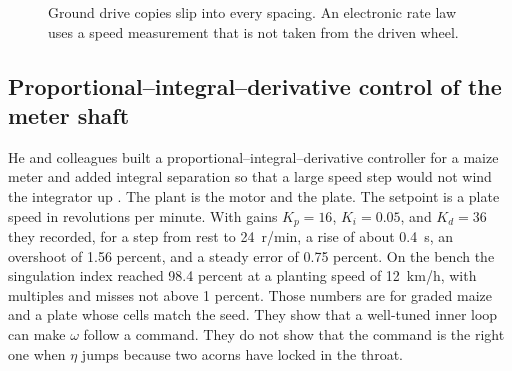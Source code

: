 \begin{figure}[htbp]
\centering
{}
\caption{Ground drive copies slip into every spacing. An electronic rate law uses a speed measurement that is not taken from the driven wheel.}
\label{fig:slip}
\end{figure}

\subsection{Proportional--integral--derivative control of the meter shaft}

He and colleagues built a proportional--integral--derivative controller for a maize meter and added integral separation so that a large speed step would not wind the integrator up \cite{he2017}. The plant is the motor and the plate. The setpoint is a plate speed in revolutions per minute. With gains $K_p=16$, $K_i=0.05$, and $K_d=36$ they recorded, for a step from rest to 24~r/min, a rise of about 0.4~s, an overshoot of 1.56 percent, and a steady error of 0.75 percent. On the bench the singulation index reached 98.4 percent at a planting speed of 12~km/h, with multiples and misses not above 1 percent. Those numbers are for graded maize and a plate whose cells match the seed. They show that a well-tuned inner loop can make $\omega$ follow a command. They do not show that the command is the right one when $\eta$ jumps because two acorns have locked in the throat.

